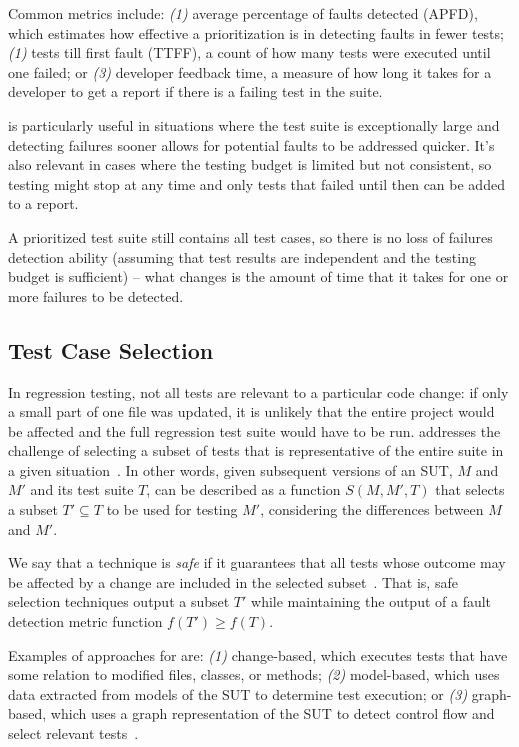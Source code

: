 Common metrics include: \textit{(1)} average percentage of faults detected (APFD), which estimates how effective a prioritization is in detecting faults in fewer tests; \textit{(1)} tests till first fault (TTFF), a count of how many tests were executed until one failed; or \textit{(3)} developer feedback time, a measure of how long it takes for a developer to get a report if there is a failing test in the suite.

\tcp is particularly useful in situations where the test suite is exceptionally large and detecting failures sooner allows for potential faults to be addressed quicker.
It's also relevant in cases where the testing budget is limited but not consistent, so testing might stop at any time and only tests that failed until then can be added to a report.

A prioritized test suite still contains all test cases, 
so there is no loss of failures detection ability (assuming that test results are independent and the testing budget is sufficient) -- what changes is the amount of time that it takes for one or more failures to be detected.


\subsection{Test Case Selection}
\label{sec:tcs}

In regression testing, not all tests are relevant to a particular code change:
if only a small part of one file was updated, it is unlikely that the entire project would be affected and the full regression test suite would have to be run.
\tcs addresses the challenge of selecting a subset of tests that is representative of the entire suite in a given situation~\cite{YooHarman10RegressionTestingSurvey, RothermelHarrold94FrameworkForEvaluationRTS}.
In other words, given subsequent versions of an SUT, $M$ and $M'$ and its test suite $T$, 
\tcs can be described as a function $S(M, M', T)$ that selects a subset $T' \subseteq T$ to be used for testing $M'$, considering the differences between $M$ and $M'$.

We say that a \tcs technique is \emph{safe} if it guarantees that all tests whose outcome may be affected by a change are included in the selected subset~\cite{RothermelHarrold94FrameworkForEvaluationRTS}.
That is, safe selection techniques output a subset $T'$ while maintaining the output of a fault detection metric function $f(T') \geq f(T)$.

Examples of approaches for \tcs are: \textit{(1)} change-based, which executes tests that have some relation to modified files, classes, or methods; \textit{(2)} model-based, which uses data extracted from models of the SUT to determine test execution; or \textit{(3)} graph-based, which uses a graph representation of the SUT to detect control flow and select relevant tests~\cite{kazmi_effective_2017}.

